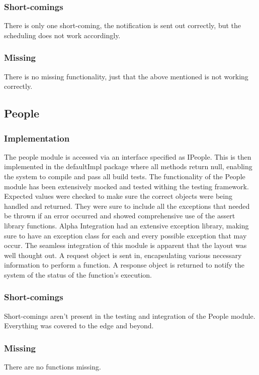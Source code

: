 \documentclass{article}
\begin{document}
        \subsubsection{Short-comings}
        There is only one short-coming, the notification is sent out correctly, but the scheduling does not work accordingly. 
        \subsubsection{Missing}
        There is no missing functionality, just that the above mentioned is not working correctly.
    \subsection{People}
        \subsubsection{Implementation}
        The people module is accessed via an interface specified as IPeople. This is then implemented in the defaultImpl package where all methods return null, enabling the system to compile and pass all build tests. The functionality of the People module has been extensively mocked and tested withing the testing framework. Expected values were checked to make sure the correct objects were being handled and returned. They were sure to include all the exceptions that needed be thrown if an error occurred and showed comprehensive use of the assert library functions. Alpha Integration had an extensive exception library, making sure to have an exception class for each and every possible exception that may occur. The seamless integration of this module is apparent that the layout was well thought out. A request object is sent in, encapsulating various necessary information to perform a function. A response object is returned to notify the system of the status of the function's execution.
        \subsubsection{Short-comings}
        Short-comings aren't present in the testing and integration of the People module. Everything was covered to the edge and beyond.
        \subsubsection{Missing}
        There are no functions missing.
        
\end{document}
